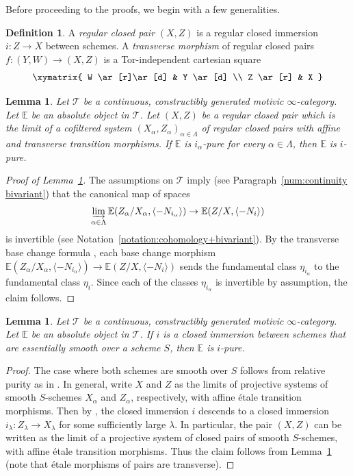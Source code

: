 \documentclass[JEP,XML,SOM,Unicode]{cedram}
\newcommand{\T}{\mathscr T}
\newcommand{\E}{\mathbb E}
\newcommand{\vb}[1]{\langle#1\rangle}
\DeclareMathOperator{\ilim}{\varinjlim}
\newtheorem{lm}[thm]{Lemma}
\theoremstyle{remark}
\theoremstyle{definition}
\newtheorem{df}[thm]{Definition}
\numberwithin{equation}{thm}
\begin{document}
Before proceeding to the proofs, we begin with a few generalities.

\begin{df}
\label{df:trans_cl_pair}
A \emph{regular closed pair} $(X,Z)$ is a regular closed immersion \hbox{$i\!:\!Z\!\to\!X$} between schemes. A \emph{transverse morphism} of regular closed pairs $f:(Y,W)\to (X,Z)$ is a Tor-independent cartesian square
\begin{equation*}
\xymatrix{
W \ar[r]\ar[d]
& Y \ar[d]
\\
Z \ar[r]
& X
}
\end{equation*}
\end{df}

\begin{lm}
\label{lem:pur_limit}
Let $\T$ be a continuous, constructibly generated motivic $\infty$-category.
Let $\E$ be an absolute object in $\T$.
Let $(X,Z)$ be a regular closed pair which is the limit of a cofiltered system $(X_\alpha,Z_\alpha)_{\alpha\in\Lambda}$ of regular closed pairs with affine and transverse transition morphisms.
If $\E$ is $i_\alpha$-pure for every $\alpha\in\Lambda$, then $\E$ is $i$-pure.
\end{lm}

\begin{proof}[Proof of Lemma~\ref{lem:pur_limit}]
The assumptions on $\T$ imply (see Paragraph~\ref{num:continuity bivariant}) that the canonical map of spaces
\begin{equation*}
\ilim_{\alpha\in\Lambda} \E(Z_\alpha/X_\alpha, \vb{-N_{i_\alpha}}) \to \E(Z/X, \vb{-N_i})
\end{equation*}
is invertible (see Notation~\ref{notation:cohomology+bivariant}).
By the transverse base change formula \cite[Th.\,3.2.21]{DJK}, each base change morphism $\E(Z_\alpha/X_\alpha, \vb{-N_{i_\alpha}}) \to \E(Z/X, \vb{-N_i})$ sends the fundamental class $\eta_{i_\alpha}$ to the fundamental class $\eta_i$.
Since each of the classes $\eta_{i_\alpha}$ is invertible by assumption, the claim follows.
\end{proof}

\begin{lm}
\label{lm:pur_ess_sm}
Let $\T$ be a continuous, constructibly generated motivic $\infty$-category.
Let $\E$ be an absolute object in $\T$.
If $i$ is a closed immersion between schemes that are essentially smooth over a scheme $S$, then $\E$ is $i$-pure.
\end{lm}
\begin{proof}
The case where both schemes are smooth over $S$ follows from relative purity as in \cite[Prop.\,4.3.10(i)]{DJK}.
In general, write $X$ and $Z$ as the limits of projective systems of smooth $S$-schemes $X_\alpha$ and $Z_\alpha$, respectively, with affine étale transition morphisms.
Then by \cite[Th.\,8.8.2(ii), Prop.\,8.6.3]{EGA4}, the closed immersion $i$ descends to a closed immersion $i_\lambda : Z_\lambda \to X_\lambda$ for some sufficiently large $\lambda$.
In particular, the pair $(X, Z)$ can be written as the limit of a projective system of closed pairs of smooth $S$-schemes, with affine étale transition morphisms.
Thus the claim follows from Lemma~\ref{lem:pur_limit} (note that étale morphisms of pairs are transverse).
\end{proof}
\end{document}
